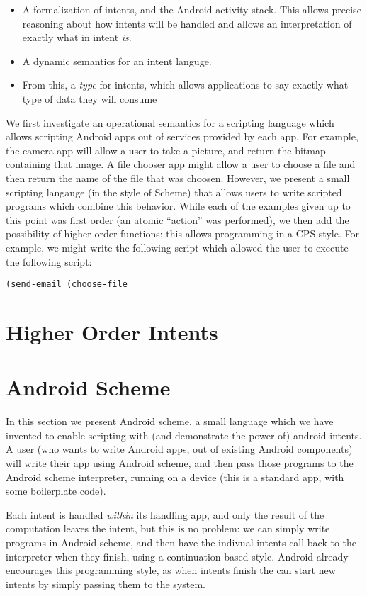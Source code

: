\documentclass{acm_proc_article-sp}
\begin{document}
\begin{itemize}
\item A formalization of intents, and the Android activity stack.
  This allows precise reasoning about how intents will be handled and
  allows an interpretation of exactly what in intent \emph{is}.
\item A dynamic semantics for an intent languge.
\item From this, a \emph{type} for intents, which allows applications
  to say exactly what type of data they will consume 
\end{itemize}

We first investigate an operational semantics for a scripting language
which allows scripting Android apps out of services provided by each
app.  For example, the camera app will allow a user to take a picture,
and return the bitmap containing that image.  A file chooser app might
allow a user to choose a file and then return the name of the file
that was choosen.  However, we present a small scripting langauge (in
the style of Scheme) that allows users to write scripted programs
which combine this behavior.  While each of the examples given up to
this point was first order (an atomic ``action'' was performed), we
then add the possibility of higher order functions: this allows
programming in a CPS style.  For example, we might write the following
script which allowed the user to execute the following script:

\begin{verbatim}
(send-email (choose-file
\end{verbatim}

\section{Higher Order Intents}

\section{Android Scheme}

In this section we present Android scheme, a small language which we
have invented to enable scripting with (and demonstrate the power of)
android intents.  A user (who wants to write Android apps, out of
existing Android components) will write their app using Android
scheme, and then pass those programs to the Android scheme
interpreter, running on a device (this is a standard app, with some
boilerplate code).

Each intent is handled \emph{within} its handling app, and only the
result of the computation leaves the intent, but this is no problem:
we can simply write programs in Android scheme, and then have the
indivual intents call back to the interpreter when they finish, using
a continuation based style.  Android already encourages this
programming style, as when intents finish the can start new intents by
simply passing them to the system.
\end{document}
